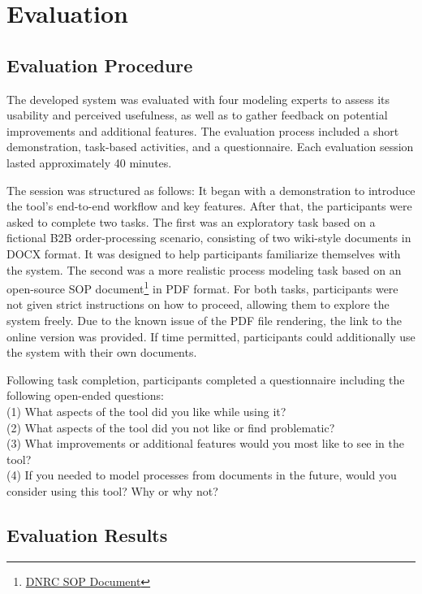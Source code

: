 \chapter{Evaluation}
\label{sec:evaluation} 

\section{Evaluation Procedure}
The developed system was evaluated with four modeling experts to assess its usability and perceived usefulness, as well as to gather feedback on potential improvements and additional features. The evaluation process included a short demonstration, task-based activities, and a questionnaire. Each evaluation session lasted approximately 40 minutes.

The session was structured as follows: It began with a demonstration to introduce the tool's end-to-end workflow and key features. After that, the participants were asked to complete two tasks. The first was an exploratory task based on a fictional B2B order-processing scenario, consisting of two wiki-style documents in DOCX format. It was designed to help participants familiarize themselves with the system. The second was a more realistic process modeling task based on an open-source SOP document\footnote{\href{https://dnrc.mt.gov/_docs/forestry/Wildfire/agreements-plans-guides/DNRC-Manuals/300-Fire-Business-Manual/Appendix-300-Manual/2023_Fire_Contract_PMT_SOP.pdf}{DNRC SOP Document}} in PDF format. For both tasks, participants were not given strict instructions on how to proceed, allowing them to explore the system freely. Due to the known issue of the PDF file rendering, the link to the online version was provided. If time permitted, participants could additionally use the system with their own documents. 

Following task completion, participants completed a questionnaire including the following open-ended questions: \\
(1) What aspects of the tool did you like while using it? \\
(2) What aspects of the tool did you not like or find problematic? \\
(3) What improvements or additional features would you most like to see in the tool? \\
(4) If you needed to model processes from documents in the future, would you consider using this tool? Why or why not?

\section{Evaluation Results}
